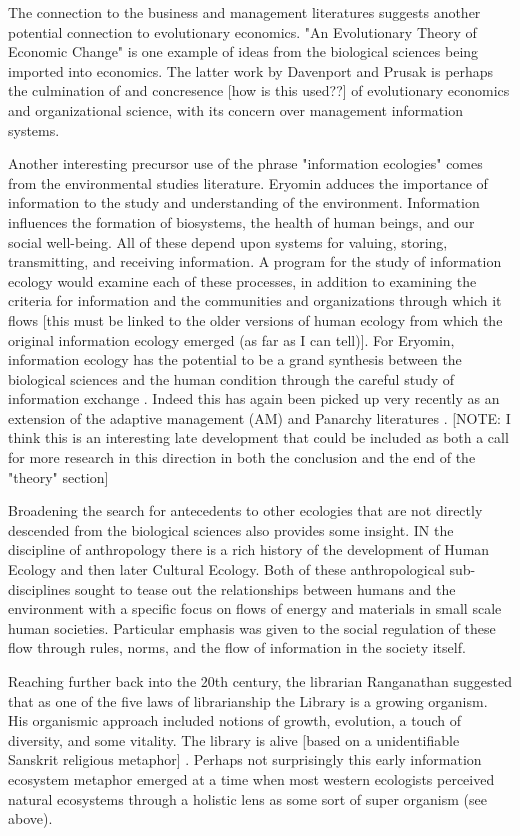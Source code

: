 The connection to the business and management literatures suggests another potential connection to evolutionary economics. "An Evolutionary Theory of Economic Change" \citep{nelson_evolutionary_1985} is one example of ideas from the biological sciences being imported into economics. The latter work by Davenport and Prusak is perhaps the culmination of and concresence [how is this used??] of evolutionary economics and organizational science, with its concern over management information systems.

Another interesting precursor use of the phrase "information ecologies" comes from the environmental studies literature. Eryomin adduces the importance of information to the study and understanding of the environment. Information influences the formation of biosystems, the health of human beings, and our social well-being. All of these depend upon systems for valuing, storing, transmitting, and receiving information. A program for the study of information ecology would examine each of these processes, in addition to examining the criteria for information and the communities and organizations through which it flows [this must be linked to the older versions of human ecology from which the original information ecology emerged (as far as I can tell)]. For Eryomin, information ecology has the potential to be a grand synthesis between the biological sciences and the human condition through the careful study of information exchange \citep{eryomin_information_1998}. Indeed this has again been picked up very recently as an extension of the adaptive management (AM) and Panarchy literatures \citep{eddy_information_2014}. [NOTE: I think this is an interesting late development that could be included as both a call for more research in this direction in both the conclusion and the end of the "theory" section]

Broadening the search for antecedents to other ecologies that are not directly descended from the biological sciences also provides some insight. IN the discipline of anthropology there is a rich history of the development of Human Ecology and then later Cultural Ecology. Both of these anthropological sub-disciplines sought to tease out the relationships between humans and the environment with a specific focus on flows of energy and materials in small scale human societies. Particular emphasis was given to the social regulation of these flow through rules, norms, and the flow of information in the society itself. 
 
Reaching further back into the 20th century, the librarian Ranganathan suggested that as one of the five laws of librarianship the Library is a growing organism. His organismic approach included notions of growth, evolution, a touch of diversity, and some vitality. The library is alive [based on a unidentifiable Sanskrit religious metaphor] \citep{ranganathan_1931}. Perhaps not surprisingly this early information ecosystem metaphor emerged at a time when most western ecologists perceived natural ecosystems through a holistic lens as some sort of super organism (see above).
